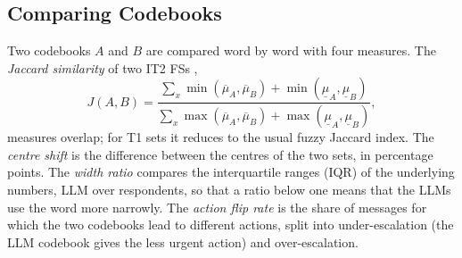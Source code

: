 \begin{table}[t]
\caption{Crisis levels, the CAPphrase word that names each level, and the action for each reply word
(A0 continue, A1 suggest a helpline, A2 human counsellor, A3 urgent handover with emergency numbers).}
\label{tab:rules}

\end{table}

\subsection{Comparing Codebooks}
\label{sec:concept-compare}

Two codebooks $A$ and $B$ are compared word by word with four measures.
The \emph{Jaccard similarity} of two IT2 FSs \citep{wu2009comparative},
\begin{equation}
J(A, B) = \frac{\sum_{x} \min(\overline{\mu}_A, \overline{\mu}_B) + \min(\underline{\mu}_A, \underline{\mu}_B)}
{\sum_{x} \max(\overline{\mu}_A, \overline{\mu}_B) + \max(\underline{\mu}_A, \underline{\mu}_B)},
\label{eq:jaccard}
\end{equation}
measures overlap; for T1 sets it reduces to the usual fuzzy Jaccard index.
The \emph{centre shift} is the difference between the centres of the two sets, in percentage points.
The \emph{width ratio} compares the interquartile ranges (IQR) of the underlying numbers, LLM over respondents, so that a
ratio below one means that the LLMs use the word more narrowly.
The \emph{action flip rate} is the share of messages for which the two codebooks lead to different actions, split into
under-escalation (the LLM codebook gives the less urgent action) and over-escalation.
